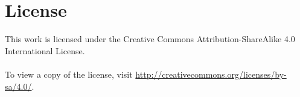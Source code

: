 \section*{License}
This work is licensed under the Creative Commons Attribution-ShareAlike 4.0 International License.\\\\To view a copy of the license, visit \url{http://creativecommons.org/licenses/by-sa/4.0/}.